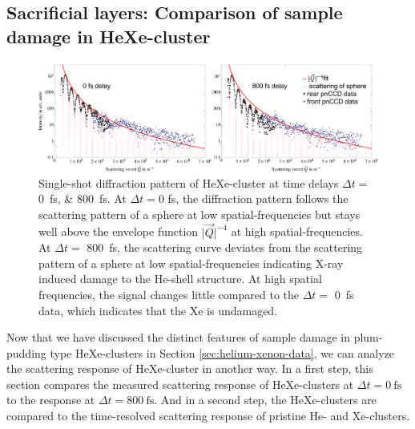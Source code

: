 %
%
%
%
\subsection{Sacrificial layers: Comparison of sample damage in HeXe-cluster}\label{sec:comparison-of-He-and-HeXe-clusters}
%
\begin{figure}
	\centering
		\includegraphics[width=1.00\textwidth]{images/results/HeXe-comparison-0-800-fs.png}
	\caption[Single-shot diffraction patterns of HeXe-cluster at different time delays]{Single-shot diffraction pattern of HeXe-cluster at time delays $\Delta t =$ 
	\SIlist{0;800}{\femto\second}. At $\Delta t=0$ fs, the diffraction pattern follows the scattering pattern of a sphere at low spatial-frequencies but stays well above the envelope function $\lvert\vec{Q}\rvert^{-4}$ at high spatial-frequencies. At $\Delta t=$ \SI{800}{\femto\second}, the scattering curve deviates from the scattering pattern of a sphere at low spatial-frequencies indicating X-ray induced damage to the He-shell structure. At high spatial frequencies, the signal changes little compared to the $\Delta t=$ \SI{0}{\femto\second} data, which indicates that the Xe is undamaged.
	}
	\label{fig:HeXe-comparison-0-800-fs}
\end{figure}
%
Now that we have discussed the distinct features of sample damage in plum-pudding type HeXe-clusters in Section \ref{sec:helium-xenon-data}, we can analyze the scattering response of HeXe-cluster in another way. In a first step, this section compares the measured scattering response of HeXe-clusters at $\Delta t=\SI{0}{\femto\second}$ to the response at  $\Delta t=\SI{800}{\femto\second}$. And in a second step, the HeXe-clusters are compared to the time-resolved scattering response of pristine He- and Xe-clusters.\\[1\baselineskip]
